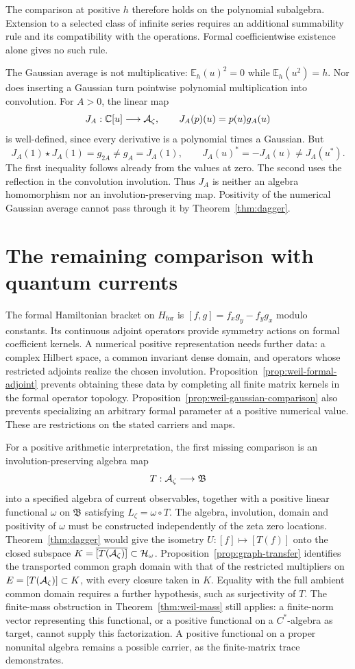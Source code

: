 The comparison at positive $h$ therefore holds on the polynomial
subalgebra.  Extension to a selected class of infinite series requires
an additional summability rule and its compatibility with the operations.
Formal coefficientwise existence alone gives no such rule.

The Gaussian average is not multiplicative:
$\mathbb E_h(u)^2=0$ while $\mathbb E_h(u^2)=h$.
Nor does inserting a Gaussian turn pointwise polynomial multiplication
into convolution.  For $A>0$, the linear map
\[
 J_A:\mathbb C[u]\longrightarrow\mathcal A_\zeta,\qquad J_A(p)(u)=p(u)g_A(u)
\]
is well-defined, since every derivative is a polynomial times a Gaussian.
But
\[
 J_A(1)\star J_A(1)=g_{2A}\ne g_A=J_A(1),
 \qquad J_A(u)^*=-J_A(u)\ne J_A(u^*).
\]
The first inequality follows already from the values at zero.
The second uses the reflection in the convolution involution.
Thus $J_A$ is neither an algebra homomorphism nor an involution-preserving
map.  Positivity of the numerical Gaussian average cannot pass through
it by Theorem~\ref{thm:dagger}.

\section{The remaining comparison with quantum currents}
\label{sec:weil-current-comparison}

The formal Hamiltonian bracket on $H_{\mathrm{for}}$ is
$[f,g]=f_xg_y-f_yg_x$ modulo constants.
Its continuous adjoint operators provide symmetry actions on formal
coefficient kernels.  A numerical positive representation needs further
data: a complex Hilbert space, a common invariant dense domain, and
operators whose restricted adjoints realize the chosen involution.
Proposition~\ref{prop:weil-formal-adjoint} prevents obtaining these data
by completing all finite matrix kernels in the formal operator topology.
Proposition~\ref{prop:weil-gaussian-comparison} also prevents specializing
an arbitrary formal parameter at a positive numerical value.
These are restrictions on the stated carriers and maps.

For a positive arithmetic interpretation, the first missing comparison
is an involution-preserving algebra map
\[
 T:\mathcal A_\zeta\longrightarrow\mathfrak B
\]
into a specified algebra of current observables, together with a positive
linear functional $\omega$ on $\mathfrak B$ satisfying
$L_\zeta=\omega\circ T$.
The algebra, involution, domain and positivity of $\omega$ must be
constructed independently of the zeta zero locations.
Theorem~\ref{thm:dagger} would give the isometry
$U:[f]\mapsto[T(f)]$ onto the closed subspace
$K=\overline{[T(\mathcal A_\zeta)]}\subset\mathcal H_\omega$.
Proposition~\ref{prop:graph-transfer} identifies the transported common
graph domain with that of the restricted multipliers on
$E=[T(\mathcal A_\zeta)]\subset K$, with every closure taken in $K$.
Equality with the full ambient common domain requires a further
hypothesis, such as surjectivity of $T$.
The finite-mass obstruction in Theorem~\ref{thm:weil-mass} still applies:
a finite-norm vector representing this functional, or a positive
functional on a $C^*$-algebra as target, cannot supply this factorization.
A positive functional on a proper nonunital algebra remains a possible
carrier, as the finite-matrix trace demonstrates.

